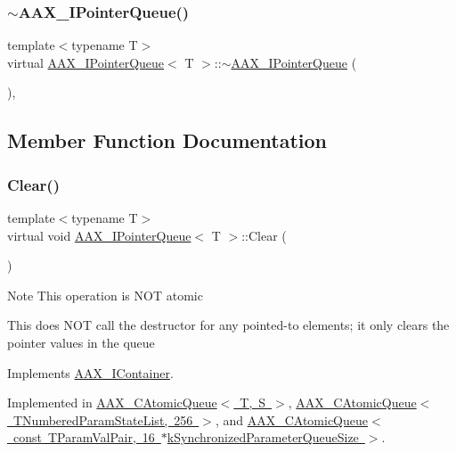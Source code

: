 \subsubsection{\texorpdfstring{$\sim$AAX\_IPointerQueue()}{~AAX\_IPointerQueue()}}
{\footnotesize\ttfamily template$<$typename T$>$ \\
virtual \mbox{\hyperlink{a01861}{A\+A\+X\+\_\+\+I\+Pointer\+Queue}}$<$ T $>$\+::$\sim$\mbox{\hyperlink{a01861}{A\+A\+X\+\_\+\+I\+Pointer\+Queue}} (\begin{DoxyParamCaption}{ }\end{DoxyParamCaption})\hspace{0.3cm}{\ttfamily [inline]}, {\ttfamily [virtual]}}



\subsection{Member Function Documentation}
\mbox{\label{a01861_a42bdf5794a2481d0ae3f294fd8f8203e}} 
\subsubsection{\texorpdfstring{Clear()}{Clear()}}
{\footnotesize\ttfamily template$<$typename T$>$ \\
virtual void \mbox{\hyperlink{a01861}{A\+A\+X\+\_\+\+I\+Pointer\+Queue}}$<$ T $>$\+::Clear (\begin{DoxyParamCaption}{ }\end{DoxyParamCaption})\hspace{0.3cm}{\ttfamily [pure virtual]}}





\begin{DoxyNote}{Note}
This operation is N\+OT atomic 

This does N\+OT call the destructor for any pointed-\/to elements; it only clears the pointer values in the queue 
\end{DoxyNote}


Implements \mbox{\hyperlink{a01785_a35280907fac53883d3501beef8c30596}{A\+A\+X\+\_\+\+I\+Container}}.



Implemented in \mbox{\hyperlink{a01441_a9819ff531e285f2acd2c9fd2351617c4}{A\+A\+X\+\_\+\+C\+Atomic\+Queue$<$ T, S $>$}}, \mbox{\hyperlink{a01441_a9819ff531e285f2acd2c9fd2351617c4}{A\+A\+X\+\_\+\+C\+Atomic\+Queue$<$ T\+Numbered\+Param\+State\+List, 256 $>$}}, and \mbox{\hyperlink{a01441_a9819ff531e285f2acd2c9fd2351617c4}{A\+A\+X\+\_\+\+C\+Atomic\+Queue$<$ const T\+Param\+Val\+Pair, 16 $\ast$k\+Synchronized\+Parameter\+Queue\+Size $>$}}.

